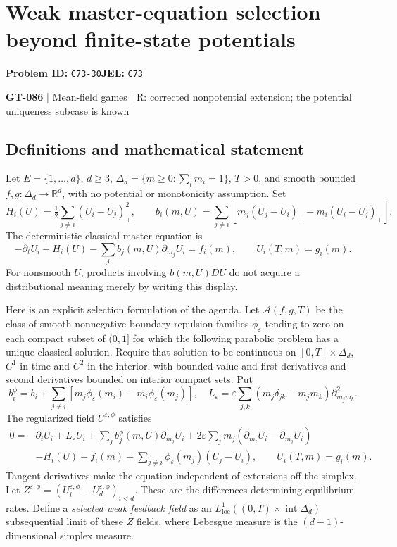 \documentclass[11pt,a4paper]{article}
\begin{document}
\section*{Weak master-equation selection beyond finite-state potentials}
\textbf{Problem ID:} \texttt{C73-30}\quad \textbf{JEL:} \texttt{C73}\par
\label{problem:OP-0216}
\label{game:GT-086}
{\sffamily\small\color{muted}
{\small\textbf{GT-086} | Mean-field games | R: corrected nonpotential extension; the potential uniqueness subcase is known\par}
\par}
\subsection*{Definitions and mathematical statement}
Let $E=\{1,\ldots,d\}$, $d\geq3$, $\Delta_d=\{m\geq0:\sum_i m_i=1\}$, $T>0$, and smooth bounded $f,g:\Delta_d\to\mathbb R^d$, with no potential or monotonicity assumption. Set
\[
 H_i(U)=\tfrac12\sum_{j\ne i}(U_i-U_j)_+^2,\qquad
 b_i(m,U)=\sum_{j\ne i}[m_j(U_j-U_i)_+-m_i(U_i-U_j)_+].
\]
The deterministic classical master equation is
\[
 -\partial_tU_i+H_i(U)-\sum_j b_j(m,U)\partial_{m_j}U_i=f_i(m),
 \qquad U_i(T,m)=g_i(m).
\]
For nonsmooth $U$, products involving $b(m,U)DU$ do not acquire a distributional meaning merely by writing this display.

Here is an explicit selection formulation of the agenda. Let $\mathcal A(f,g,T)$ be the class of smooth nonnegative boundary-repulsion families $\phi_\varepsilon$ tending to zero on each compact subset of $(0,1]$ for which the following parabolic problem has a unique classical solution. Require that solution to be continuous on $[0,T]\times\Delta_d$, $C^1$ in time and $C^2$ in the interior, with bounded value and first derivatives and second derivatives bounded on interior compact sets. Put
\[
 b_i^\phi=b_i+\sum_{j\ne i}[m_j\phi_\varepsilon(m_i)-m_i\phi_\varepsilon(m_j)],\quad
 L_\varepsilon=\varepsilon\sum_{j,k}(m_j\delta_{jk}-m_jm_k)\partial_{m_jm_k}^2.
\]
The regularized field $U^{\varepsilon,\phi}$ satisfies
\[
 \begin{split}
 0={}&\partial_tU_i+L_\varepsilon U_i+\sum_j b_j^\phi(m,U)\partial_{m_j}U_i
 +2\varepsilon\sum_jm_j(\partial_{m_i}U_i-\partial_{m_j}U_i)\\
 &-H_i(U)+f_i(m)+\sum_{j\ne i}\phi_\varepsilon(m_j)(U_j-U_i),
 \qquad U_i(T,m)=g_i(m).
 \end{split}
\]
Tangent derivatives make the equation independent of extensions off the simplex. Let $Z^{\varepsilon,\phi}=(U_i^{\varepsilon,\phi}-U_d^{\varepsilon,\phi})_{i<d}$. These are the differences determining equilibrium rates. Define a \emph{selected weak feedback field} as an $L^1_{\mathrm{loc}}((0,T)\times\operatorname{int}\Delta_d)$ subsequential limit of these $Z$ fields, where Lebesgue measure is the $(d-1)$-dimensional simplex measure.
\end{document}
